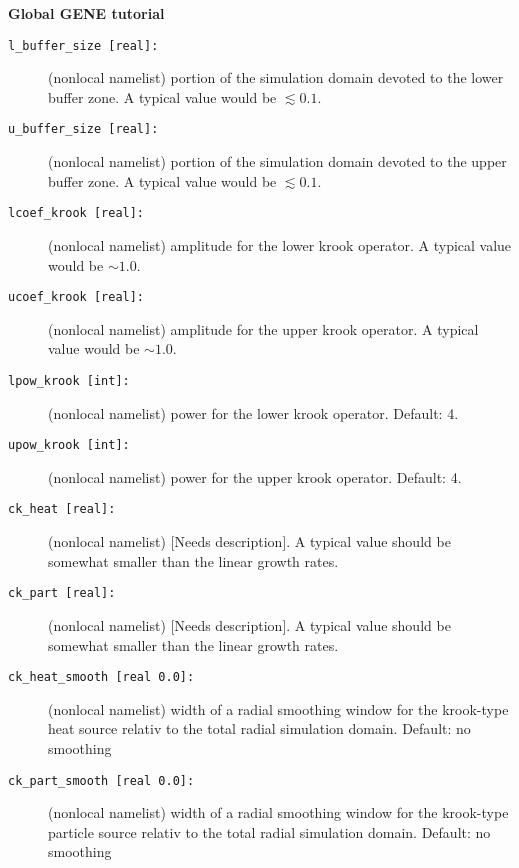 \documentclass[11pt]{article}
\begin{document}
\baselineskip=24pt

\begin{titlepage}

\centerline{\bf Global GENE tutorial }


\bigskip

\medskip

\baselineskip=24pt



\begin{description}
\item[\texttt{l\_buffer\_size [real]:}] (nonlocal namelist) portion of the simulation domain devoted to the lower buffer zone.  A typical value would be $\lesssim 0.1$.
\item[\texttt{u\_buffer\_size [real]:}] (nonlocal namelist) portion of the simulation domain devoted to the upper buffer zone.  A typical value would be $\lesssim 0.1$.
\item[\texttt{lcoef\_krook [real]:}] (nonlocal namelist) amplitude for the lower krook operator.  A typical value would be $\sim 1.0$.
\item[\texttt{ucoef\_krook [real]:}] (nonlocal namelist) amplitude for the upper krook operator.  A typical value would be $\sim 1.0$.
\item[\texttt{lpow\_krook [int]:}] (nonlocal namelist) power for the lower krook operator.  Default: 4.
\item[\texttt{upow\_krook [int]:}] (nonlocal namelist) power for the upper krook operator.  Default: 4. 
\item[\texttt{ck\_heat [real]:}] (nonlocal namelist) [Needs description].  A typical value should be somewhat smaller than the linear growth rates.
\item[\texttt{ck\_part [real]:}] (nonlocal namelist) [Needs description].  A typical value should be somewhat smaller than the linear growth rates.
\item[\texttt{ck\_heat\_smooth [real 0.0]:}] (nonlocal namelist) width of a radial smoothing window for the krook-type heat source relativ to the total radial simulation domain. Default: no smoothing
\item[\texttt{ck\_part\_smooth [real 0.0]:}] (nonlocal namelist) width of a radial smoothing window for the krook-type particle source relativ to the total radial simulation domain. Default: no smoothing

\end{description}


\end{titlepage}
\end{document}
